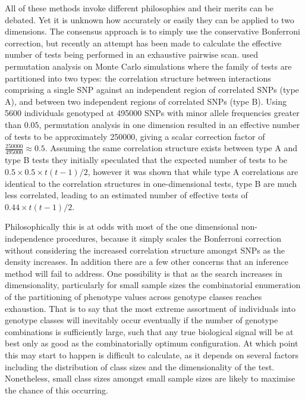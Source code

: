 All of these methods invoke different philosophies and their merits can be debated. Yet it is unknown how accurately or easily they can be applied to two dimensions. The consensus approach is to simply use the conservative Bonferroni correction, but recently an attempt has been made to calculate the effective number of tests being performed in an exhaustive pairwise scan. \citet{Becker2011} used permutation analysis on Monte Carlo simulations where the family of tests are partitioned into two types: the correlation structure between interactions comprising a single SNP against an independent region of correlated SNPs (type A), and between two independent regions of correlated SNPs (type B). Using 5600 individuals genotyped at 495000 SNPs with minor allele frequencies greater than $0.05$, permutation analysis in one dimension resulted in an effective number of tests to be approximately 250000, giving a scalar correction factor of $\frac{250000}{495000} \approx 0.5$. Assuming the same correlation structure exists between type A and type B tests they initially speculated that the expected number of tests to be $0.5 \times 0.5 \times t(t-1)/2$, however it was shown that while type A correlations are identical to the correlation structures in one-dimensional tests, type B are much less correlated, leading to an estimated number of effective tests of $0.44 \times t(t-1)/2$.

Philosophically this is at odds with most of the one dimensional non-independence procedures, because it simply scales the Bonferroni correction without considering the increased correlation structure amongst SNPs as the density increases. In addition there are a few other concerns that an inference method will fail to address. One possibility is that as the search increases in dimensionality, particularly for small sample sizes the combinatorial enumeration of the partitioning of phenotype values across genotype classes reaches exhaustion. That is to say that the most extreme assortment of individuals into genotype classes will inevitably occur eventually if the number of genotype combinations is sufficiently large, such that any true biological signal will be at best only as good as the combinatorially optimum configuration. At which point this may start to happen is difficult to calculate, as it depends on several factors including the distribution of class sizes and the dimensionality of the test. Nonetheless, small class sizes amongst small sample sizes are likely to maximise the chance of this occurring.

